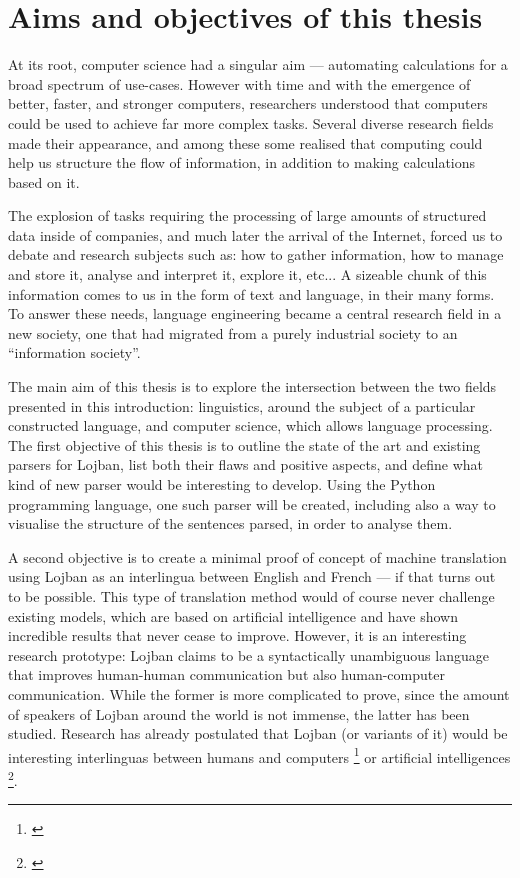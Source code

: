 \section{Aims and objectives of this thesis}

At its root, computer science had a singular aim --- automating calculations for a broad spectrum of use-cases. However with time and with the emergence of better, faster, and
stronger computers, researchers understood that computers could be used to achieve far more complex tasks. Several diverse research fields made their appearance, and among these
some realised that computing could help us structure the flow of information, in addition to making calculations based on it. \newline

The explosion of tasks requiring the processing of large amounts of structured data inside of companies, and much later the arrival of the Internet, forced us to debate and
research subjects such as: how to gather information, how to manage and store it, analyse and interpret it, explore it, etc... A sizeable chunk of this information comes to us
in the form of text and language, in their many forms. To answer these needs, language engineering became a central research field in a new society, one that had migrated
from a purely industrial society to an ``information society''.\newline

The main aim of this thesis is to explore the intersection between the two fields presented in this introduction: linguistics, around the subject of a particular constructed
language, and computer science, which allows language processing. The first objective of this thesis is to outline the state of the art and existing parsers for Lojban, list both
their flaws and positive aspects, and define what kind of new parser would be interesting to develop. Using the Python programming language, one such parser will be created, including
also a way to visualise the structure of the sentences parsed, in order to analyse them.\newline

A second objective is to create a minimal proof of concept of machine translation using Lojban as an interlingua between English and French --- if that turns out to be possible.
This type of translation method would of course never challenge existing models, which are based on artificial intelligence and have shown incredible results that never cease to
improve. However, it is an interesting research prototype: Lojban claims to be a syntactically unambiguous language that improves human-human communication but also human-computer
communication. While the former is more complicated to prove, since the amount of speakers of Lojban around the world is not immense, the latter has been studied. Research has already
postulated that Lojban (or variants of it) would be interesting interlinguas between humans and computers \footnote{\cite{speer2004meeting}} or artificial
intelligences \footnote{\cite{goertzel2013lojban}}.

